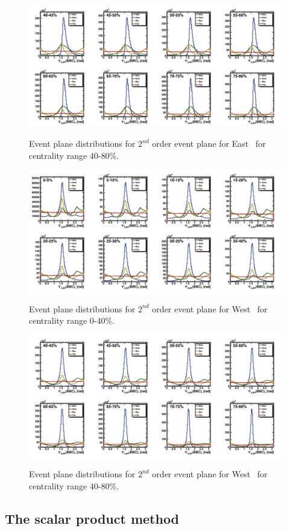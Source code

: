 \begin{figure}[ht]
    \includegraphics[width=0.99\textwidth]{Figures/PsiEast_harm1_1.png}
    \label{fig:BBC_East_EP2}
    \caption{Event plane distributions for $2^{nd}$ order event plane for East \BBC\ for centrality range 40-80\%.}
\end{figure}

\begin{figure}[ht]
    \includegraphics[width=0.99\textwidth]{Figures/PsiWest_harm1_0.png}
    \label{fig:BBC_East_EP1}
    \caption{Event plane distributions for $2^{nd}$ order event plane for West \BBC\ for centrality range 0-40\%.}
\end{figure}

\begin{figure}[ht]
    \includegraphics[width=0.99\textwidth]{Figures/PsiWest_harm1_1.png}
    \label{fig:BBC_East_EP2}
    \caption{Event plane distributions for $2^{nd}$ order event plane for West \BBC\ for centrality range 40-80\%.}
\end{figure}

\FloatBarrier
\subsection{The scalar product method}